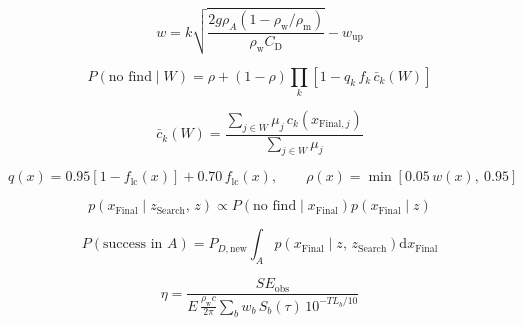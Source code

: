 \begin{equation}
  w = k\sqrt{\frac{2g\rho_{A}\left(1-\rho_{\mathrm{w}}/\rho_{\mathrm{m}}\right)}{\rho_{\mathrm{w}}C_{\mathrm{D}}}} - w_{\mathrm{up}}
  \label{eq:25}
\end{equation}

\begin{equation}
  P\left(\text{no find} \mid W\right) = \rho + (1-\rho) \prod_{k} \left[ 1 - q_{k}\, f_{k}\, \bar{c}_{k}(W) \right]
  \label{eq:26}
\end{equation}

\begin{equation}
  \bar{c}_{k}(W) = \frac{\sum_{j \in W} \mu_{j}\, c_{k}\left(x_{\mathrm{Final},j}\right)}{\sum_{j \in W} \mu_{j}}
  \label{eq:27}
\end{equation}

\begin{equation}
  q(x) = 0.95\left[1 - f_{\mathrm{lc}}(x)\right] + 0.70\, f_{\mathrm{lc}}(x), \qquad \rho(x) = \min\left[0.05\, w(x),\ 0.95\right]
  \label{eq:28}
\end{equation}

\begin{equation}
  p\left(x_{\mathrm{Final}} \mid z_{\mathrm{Search}},\, z\right) \propto P\left(\text{no find} \mid x_{\mathrm{Final}}\right) p\left(x_{\mathrm{Final}} \mid z\right)
  \label{eq:29}
\end{equation}

\begin{equation}
  P\left(\text{success in } A\right) = P_{D,\mathrm{new}} \int_{A} p\left(x_{\mathrm{Final}} \mid z,\, z_{\mathrm{Search}}\right) \mathrm{d}x_{\mathrm{Final}}
  \label{eq:30}
\end{equation}

\begin{equation}
  \eta = \frac{SE_{\mathrm{obs}}}{E\, \frac{\rho_{\mathrm{w}} c}{2\pi} \sum_{b} w_{b}\, S_{b}(\tau)\, 10^{-TL_{b}/10}}
  \label{eq:31}
\end{equation}

